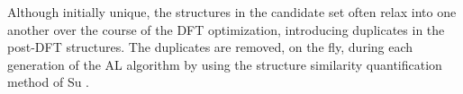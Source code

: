 %
%
Although initially unique, the structures in the candidate set often relax into one another over the course of the DFT optimization, introducing duplicates in the post-DFT structures.
%
The duplicates are removed, on the fly, during each generation of the AL algorithm
by using the structure similarity quantification method of Su .
\cite{Su2017}
%
